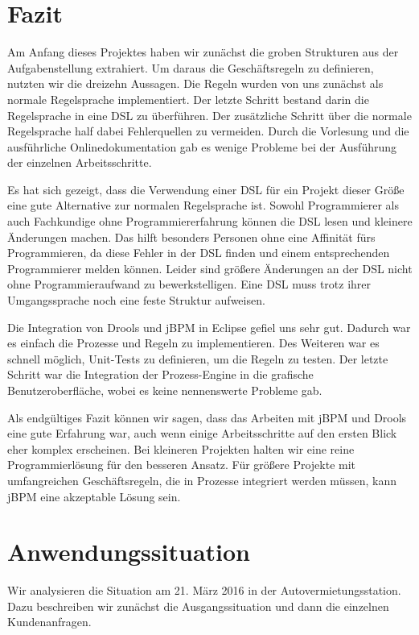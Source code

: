\newpage
\section{Fazit}
Am Anfang dieses Projektes haben wir zunächst die groben Strukturen aus der Aufgabenstellung extrahiert. Um daraus die Geschäftsregeln zu definieren, nutzten wir die dreizehn Aussagen. Die Regeln wurden von uns zunächst als normale Regelsprache implementiert. Der letzte Schritt bestand darin die Regelsprache in eine DSL zu überführen. Der zusätzliche Schritt über die normale Regelsprache half dabei Fehlerquellen zu vermeiden. Durch die Vorlesung und die ausführliche Onlinedokumentation gab es wenige Probleme bei der Ausführung der einzelnen Arbeitsschritte.

Es hat sich gezeigt, dass die Verwendung einer DSL für ein Projekt dieser Größe eine gute Alternative zur normalen Regelsprache ist. Sowohl Programmierer als auch Fachkundige ohne Programmiererfahrung können die DSL lesen und kleinere Änderungen machen. Das hilft besonders Personen ohne eine Affinität fürs Programmieren, da diese Fehler in der DSL finden und einem entsprechenden Programmierer melden können. Leider sind größere Änderungen an der DSL nicht ohne Programmieraufwand zu bewerkstelligen. Eine DSL muss trotz ihrer Umgangssprache noch eine feste Struktur aufweisen.

Die Integration von Drools und jBPM in Eclipse gefiel uns sehr gut. Dadurch war es einfach die Prozesse und Regeln zu implementieren. Des Weiteren war es schnell möglich, Unit-Tests zu definieren, um die Regeln zu testen. Der letzte Schritt war die Integration der Prozess-Engine in die grafische Benutzeroberfläche, wobei es keine nennenswerte Probleme gab.

Als endgültiges Fazit können wir sagen, dass das Arbeiten mit jBPM und Drools eine gute Erfahrung war, auch wenn einige Arbeitsschritte auf den ersten Blick eher komplex erscheinen. Bei kleineren Projekten halten wir eine reine Programmierlösung für den besseren Ansatz. Für größere Projekte mit umfangreichen Geschäftsregeln, die in Prozesse
integriert werden müssen, kann jBPM eine akzeptable Lösung sein. 

\newpage
\appendix

\section{Anwendungssituation}
\label{sec:Anwendungssituation}

Wir analysieren die Situation am 21. März 2016 in der Autovermietungsstation.
Dazu beschreiben wir zunächst die Ausgangssituation und dann die einzelnen Kundenanfragen.

